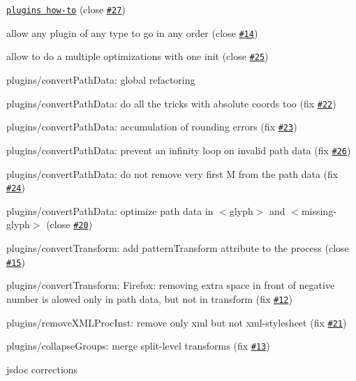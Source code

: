 \begin{DoxyItemize}
\item \href{https://github.com/svg/svgo/tree/master/plugins#readme}{\tt plugins how-\/to} (close \href{https://github.com/svg/svgo/issues/27}{\tt \#27})
\item allow any plugin of any type to go in any order (close \href{https://github.com/svg/svgo/issues/14}{\tt \#14})
\item allow to do a multiple optimizations with one init (close \href{https://github.com/svg/svgo/issues/25}{\tt \#25})
\item plugins/convert\+Path\+Data\+: global refactoring
\item plugins/convert\+Path\+Data\+: do all the tricks with absolute coords too (fix \href{https://github.com/svg/svgo/issues/22}{\tt \#22})
\item plugins/convert\+Path\+Data\+: accumulation of rounding errors (fix \href{https://github.com/svg/svgo/issues/23}{\tt \#23})
\item plugins/convert\+Path\+Data\+: prevent an infinity loop on invalid path data (fix \href{https://github.com/svg/svgo/issues/26}{\tt \#26})
\item plugins/convert\+Path\+Data\+: do not remove very first M from the path data (fix \href{https://github.com/svg/svgo/issues/24}{\tt \#24})
\item plugins/convert\+Path\+Data\+: optimize path data in $<$glyph$>$ and $<$missing-\/glyph$>$ (close \href{https://github.com/svg/svgo/issues/20}{\tt \#20})
\item plugins/convert\+Transform\+: add pattern\+Transform attribute to the process (close \href{https://github.com/svg/svgo/issues/15}{\tt \#15})
\item plugins/convert\+Transform\+: Firefox\+: removing extra space in front of negative number is alowed only in path data, but not in transform (fix \href{https://github.com/svg/svgo/issues/12}{\tt \#12})
\item plugins/remove\+X\+M\+L\+Proc\+Inst\+: remove only \textquotesingle{}xml\textquotesingle{} but not \textquotesingle{}xml-\/stylesheet\textquotesingle{} (fix \href{https://github.com/svg/svgo/issues/15}{\tt \#21})
\item plugins/collapse\+Groups\+: merge split-\/level transforms (fix \href{https://github.com/svg/svgo/issues/13}{\tt \#13})
\item jsdoc corrections
\end{DoxyItemize}

